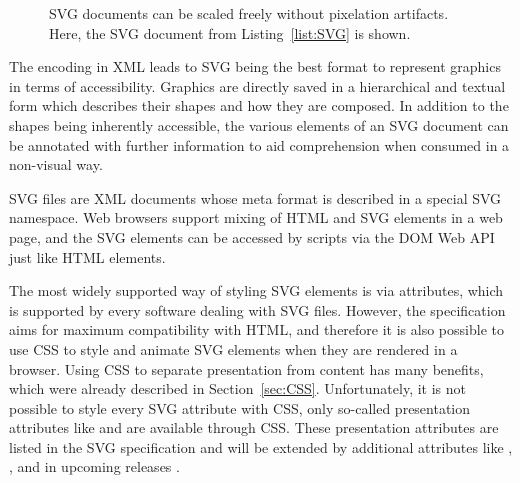 \begin{figure}[tp]
\centering
{}
\hspace{1cm}
\caption[SVG Scaling]{%
SVG documents can be scaled freely without pixelation artifacts.
Here, the SVG document from Listing~\ref{list:SVG} is shown.
}
\label{fig:SVG}
\end{figure}



The encoding in XML leads to SVG being the best format to represent
graphics in terms of accessibility. Graphics are directly saved in a
hierarchical and textual form which describes their shapes and how
they are composed. In addition to the shapes being inherently
accessible, the various elements of an SVG document can be annotated
with further information to aid comprehension when consumed in a
non-visual way.

SVG files are XML documents whose meta format is described in a
special SVG namespace. Web browsers support mixing of HTML and SVG
elements in a web page, and the SVG elements can be accessed by
scripts via the DOM Web API just like HTML elements.

The most widely supported way of styling SVG elements is via
attributes, which is supported by every software dealing with SVG
files. However, the specification aims for maximum compatibility with
HTML, and therefore it is also possible to use CSS to style and
animate SVG elements when they are rendered in a browser. Using CSS to
separate presentation from content has many benefits, which were
already described in Section~\ref{sec:CSS}. Unfortunately, it is not
possible to style every SVG attribute with CSS, only so-called
presentation attributes like  and 
are available through CSS. These presentation attributes are listed in
the SVG specification \parencite{SVG11} and will be extended by
additional attributes like , , 
and  in upcoming releases \parencite{SVG2}.


